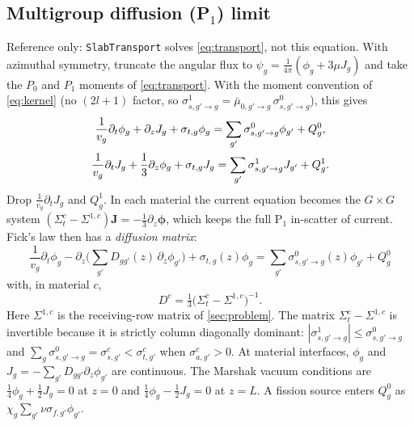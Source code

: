 \documentclass[11pt,a4paper]{article}
\newcommand{\code}[1]{\texttt{#1}}
\begin{document}
\subsection{Multigroup diffusion (\texorpdfstring{P$_1$}{P1}) limit}
\label{sec:diffusion}

Reference only: \code{SlabTransport} solves \eqref{eq:transport}, not this equation. With azimuthal symmetry, truncate the angular flux to $\psi_g=\frac{1}{4\pi}(\phi_g+3\mu J_g)$ and take the $P_0$ and $P_1$ moments of \eqref{eq:transport}. With the moment convention of \eqref{eq:kernel} (no $(2l+1)$ factor, so $\sigma^{1}_{s,g'\to g}=\bar\mu_{0,g'\to g}\,\sigma^{0}_{s,g'\to g}$), this gives
\begin{gather}
\frac{1}{v_g}\partial_t\phi_g+\partial_zJ_g+\sigma_{t,g}\phi_g=\sum_{g'}\sigma^{0}_{s,g'\to g}\phi_{g'}+Q^0_g,\notag\\
\frac{1}{v_g}\partial_tJ_g+\frac13\partial_z\phi_g+\sigma_{t,g}J_g=\sum_{g'}\sigma^{1}_{s,g'\to g}J_{g'}+Q^1_g .
\label{eq:p1}
\end{gather}
Drop $\frac{1}{v_g}\partial_tJ_g$ and $Q^1_g$. In each material the current equation becomes the $G\times G$ system $(\Sigma^c_t-\Sigma^{1,c})\bm J=-\frac13\partial_z\bm\phi$, which keeps the full P$_1$ in-scatter of current. Fick's law then has a \emph{diffusion matrix}:
\begin{equation}
\boxed{
\frac{1}{v_g}\partial_t\phi_g-\partial_z\Big(\sum_{g'}D_{gg'}(z)\,\partial_z\phi_{g'}\Big)+\sigma_{t,g}(z)\phi_g
=\sum_{g'}\sigma^{0}_{s,g'\to g}(z)\phi_{g'}+Q^0_g}
\label{eq:diffusion}
\end{equation}
with, in material $c$,
\begin{equation}
D^c=\tfrac13\big(\Sigma^c_t-\Sigma^{1,c}\big)^{-1}.
\label{eq:Dmatrix}
\end{equation}
Here $\Sigma^{1,c}$ is the receiving-row matrix of \cref{sec:problem}. The matrix $\Sigma^c_t-\Sigma^{1,c}$ is invertible because it is strictly column diagonally dominant: $|\sigma^1_{s,g'\to g}|\le\sigma^0_{s,g'\to g}$ and $\sum_g\sigma^0_{s,g'\to g}=\sigma^c_{s,g'}<\sigma^c_{t,g'}$ when $\sigma^c_{a,g'}>0$. At material interfaces, $\phi_g$ and $J_g=-\sum_{g'}D_{gg'}\partial_z\phi_{g'}$ are continuous. The Marshak vacuum conditions are $\frac14\phi_g+\frac12J_g=0$ at $z=0$ and $\frac14\phi_g-\frac12J_g=0$ at $z=L$. A fission source enters $Q^0_g$ as $\chi_g\sum_{g'}\nu\sigma_{f,g'}\phi_{g'}$.
\end{document}
